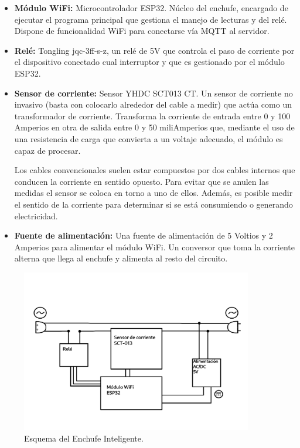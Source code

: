 \documentclass[a4paper,10pt]{article}
\begin{document}
\begin{itemize}
\item{\textbf{Módulo WiFi:} Microcontrolador
  ESP32\cite{ESP32SeriesDatasheet}. Núcleo del enchufe, encargado de
  ejecutar el programa principal que gestiona el manejo de lecturas y
  del relé. Dispone de funcionalidad WiFi para conectarse vía MQTT al
  servidor.}

\item{\textbf{Relé:} Tongling jqc-3ff-s-z, un relé de 5V que controla
  el paso de corriente por el dispositivo conectado cual interruptor y
  que es gestionado por el módulo ESP32.}

\item{\textbf{Sensor de corriente:} Sensor YHDC SCT013
  CT\cite{SCT013000DatasheetPDF}. Un sensor de corriente no invasivo
  (basta con colocarlo alrededor del cable a medir) que actúa como un
  transformador de corriente. Transforma la corriente de entrada entre
  0 y 100 Amperios en otra de salida entre 0 y 50 miliAmperios que,
  mediante el uso de una resistencia de carga que convierta a un
  voltaje adecuado, el módulo es capaz de procesar.

  Los cables convencionales suelen estar compuestos por dos cables
  internos que conducen la corriente en sentido opuesto. Para evitar
  que se anulen las medidas el sensor se coloca en torno a uno de
  ellos. Además, es posible medir el sentido de la corriente para
  determinar si se está consumiendo o generando electricidad.}

\item{\textbf{Fuente de alimentación:} Una fuente de alimentación de
  5 Voltios y 2 Amperios para alimentar el módulo WiFi. Un conversor
  que toma la corriente alterna que llega al enchufe y alimenta al
  resto del circuito.}
\end{itemize}

\begin{figure}[H]
  \centering
  \includegraphics[width=0.9\textwidth]{img/esquema_enchufe_inteligente.png}
  \caption{Esquema del Enchufe Inteligente.}\label{fig:esquema-enchufe-inteligente}
\end{figure}
\end{document}
